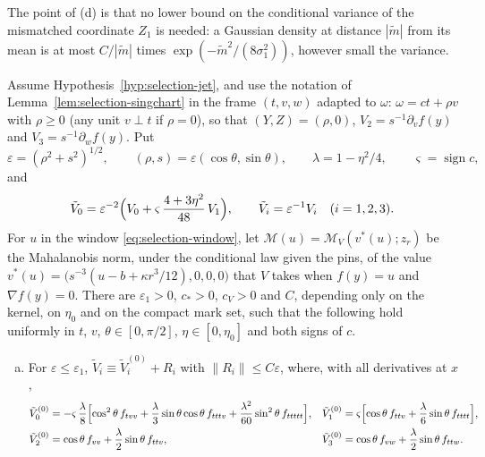The point of (d) is that no lower bound on the conditional variance of the mismatched coordinate $Z_1$ is needed: a Gaussian density at distance $|\tilde m|$ from its mean is at most $C/|\tilde m|$ times $\exp(-\tilde m^2/(8\sigma_1^2))$, however small the variance.

\begin{lemma}\label{lem:selection-finsing}
Assume Hypothesis~\ref{hyp:selection-jet}, and use the notation of Lemma~\ref{lem:selection-singchart} in the frame $(t,v,w)$ adapted to $\omega$: $\omega=ct+\rho v$ with $\rho\ge0$ (any unit $v\perp t$ if $\rho=0$), so that $(Y,Z)=(\rho,0)$, $V_2=s^{-1}\partial_vf(y)$ and $V_3=s^{-1}\partial_wf(y)$. Put
\[
\varepsilon=(\rho^2+s^2)^{1/2},\qquad(\rho,s)=\varepsilon(\cos\theta,\sin\theta),\qquad\lambda=1-\eta^2/4,\qquad\varsigma=\operatorname{sign}c,
\]
and
\begin{equation}\label{eq:selection-Wdef}
\tilde V_0=\varepsilon^{-2}\Bigl(V_0+\varsigma\,\frac{4+3\eta^2}{48}\,V_1\Bigr),\qquad\tilde V_i=\varepsilon^{-1}V_i\quad(i=1,2,3).
\end{equation}
For $u$ in the window \eqref{eq:selection-window}, let $\mathcal M(u)=\mathcal M_V(v^*(u);z_r)$ be the Mahalanobis norm, under the conditional law given the pins, of the value $v^*(u)=\bigl(s^{-3}(u-b+\kappa r^3/12),0,0,0\bigr)$ that $V$ takes when $f(y)=u$ and $\nabla f(y)=0$. There are $\varepsilon_1>0$, $c_*>0$, $c_V>0$ and $C$, depending only on the kernel, on $\eta_0$ and on the compact mark set, such that the following hold uniformly in $t$, $v$, $\theta\in[0,\pi/2]$, $\eta\in[0,\eta_0]$ and both signs of $c$.
\begin{enumerate}[(a)]
\item For $\varepsilon\le\varepsilon_1$, $\tilde V_i\equiv\tilde V_i^{(0)}+R_i$ with $\|R_i\|\le C\varepsilon$, where, with all derivatives at $x$,
\begin{equation}\label{eq:selection-Wlim}
\begin{aligned}
\tilde V^{(0)}_0&=-\varsigma\,\frac\lambda8\Bigl[\cos^2\theta\,f_{tvv}+\frac\lambda3\sin\theta\cos\theta\,f_{tttv}+\frac{\lambda^2}{60}\sin^2\theta\,f_{ttttt}\Bigr],&\tilde V^{(0)}_1&=\varsigma\Bigl[\cos\theta\,f_{ttv}+\frac\lambda6\sin\theta\,f_{tttt}\Bigr],\\
\tilde V^{(0)}_2&=\cos\theta\,f_{vv}+\frac\lambda2\sin\theta\,f_{ttv},&\tilde V^{(0)}_3&=\cos\theta\,f_{vw}+\frac\lambda2\sin\theta\,f_{ttw}.
\end{aligned}
\end{equation}

\end{enumerate}
\end{lemma}
